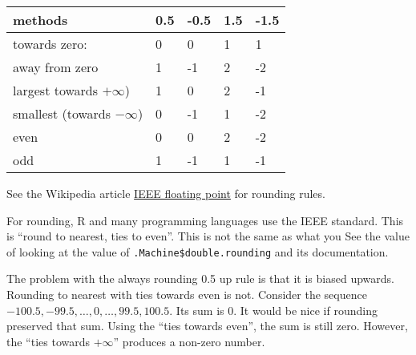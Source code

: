 \documentclass[]{book}
\newenvironment{Shaded}{\begin{snugshade}}{\end{snugshade}}
\newcommand{\CommentTok}[1]{\textcolor[rgb]{0.56,0.35,0.01}{\textit{#1}}}
\newcommand{\ControlFlowTok}[1]{\textcolor[rgb]{0.13,0.29,0.53}{\textbf{#1}}}
\newcommand{\DataTypeTok}[1]{\textcolor[rgb]{0.13,0.29,0.53}{#1}}
\newcommand{\DecValTok}[1]{\textcolor[rgb]{0.00,0.00,0.81}{#1}}
\newcommand{\FloatTok}[1]{\textcolor[rgb]{0.00,0.00,0.81}{#1}}
\newcommand{\KeywordTok}[1]{\textcolor[rgb]{0.13,0.29,0.53}{\textbf{#1}}}
\newcommand{\NormalTok}[1]{#1}
\newcommand{\OperatorTok}[1]{\textcolor[rgb]{0.81,0.36,0.00}{\textbf{#1}}}
\newcommand{\OtherTok}[1]{\textcolor[rgb]{0.56,0.35,0.01}{#1}}
\newcommand{\StringTok}[1]{\textcolor[rgb]{0.31,0.60,0.02}{#1}}
\theoremstyle{definition}
\theoremstyle{definition}
\theoremstyle{definition}
\theoremstyle{remark}
\begin{document}
\begin{longtable}[]{@{}lllll@{}}
\toprule
methods & 0.5 & -0.5 & 1.5 & -1.5\tabularnewline
\midrule
\endhead
towards zero: & 0 & 0 & 1 & 1\tabularnewline
away from zero & 1 & -1 & 2 & -2\tabularnewline
largest towards \(+\infty\)) & 1 & 0 & 2 & -1\tabularnewline
smallest (towards \(-\infty\)) & 0 & -1 & 1 & -2\tabularnewline
even & 0 & 0 & 2 & -2\tabularnewline
odd & 1 & -1 & 1 & -1\tabularnewline
\bottomrule
\end{longtable}

See the Wikipedia article
\href{https://en.wikipedia.org/wiki/IEEE_floating_point}{IEEE floating
point} for rounding rules.

For rounding, R and many programming languages use the IEEE standard.
This is ``round to nearest, ties to even''. This is not the same as what
you See the value of looking at the value of
\texttt{.Machine\$double.rounding} and its documentation.

\begin{Shaded}
\end{Shaded}

The problem with the always rounding 0.5 up rule is that it is biased
upwards. Rounding to nearest with ties towards even is not. Consider the
sequence \(-100.5, -99.5, \dots, 0, \dots, 99.5, 100.5\). Its sum is 0.
It would be nice if rounding preserved that sum. Using the ``ties
towards even'', the sum is still zero. However, the ``ties towards
\(+\infty\)'' produces a non-zero number.
\end{document}
